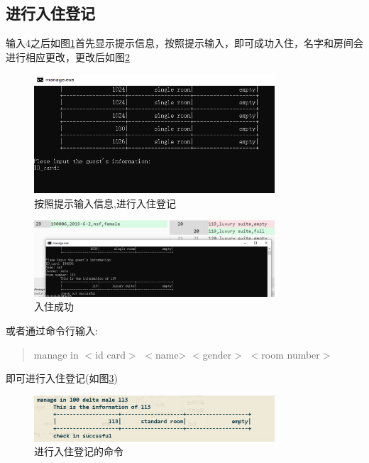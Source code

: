 \documentclass[UTF8]{ctexart}
\begin{document}
  \subsection{进行入住登记}
    输入4之后如图\ref{fig:4_1}首先显示提示信息，按照提示输入，即可成功入住，名字和房间会进行相应更改，更改后如图\ref{fig:4_2}
    \begin{figure}[H]
      \centering
      \includegraphics[width=0.8\textwidth]{4_1}
      \caption{按照提示输入信息,进行入住登记}
      \label{fig:4_1}
    \end{figure}
    \begin{figure}[H]
      \centering
      \includegraphics[width=0.8\textwidth]{4_2}
      \caption{入住成功}
      \label{fig:4_2}
    \end{figure}
    或者通过命令行输入:
    \begin{quote}
      manage in $<$id card$>$ $<$name> $<$gender$>$ $<$room number$>$
    \end{quote}
    即可进行入住登记(如图\ref{fig:c_4})
    \begin{figure}[H]
      \centering
      \includegraphics[width=0.8\textwidth]{c_4}
      \caption{进行入住登记的命令}
      \label{fig:c_4}
    \end{figure}
\end{document}
